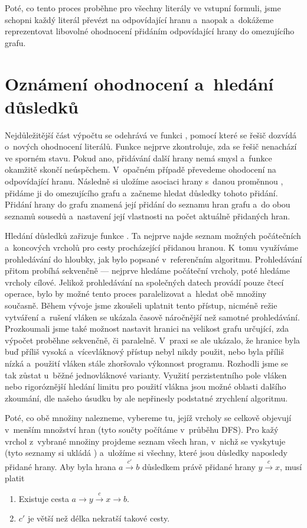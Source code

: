 Poté, co tento proces proběhne pro všechny literály ve vstupní formuli, jsme schopni každý literál převézt na odpovídající hranu a~naopak a~dokážeme reprezentovat libovolné ohodnocení přidáním odpovídající hrany do omezujícího grafu.

\section{Oznámení ohodnocení a~hledání důsledků}\label{dusl}

Nejdůležitější část výpočtu se odehrává ve funkci , pomocí které se řešič dozvídá o~nových ohodnocení literálů. Funkce nejprve zkontroluje, zda se řešič nenachází ve sporném stavu. Pokud ano, přidávání další hrany nemá smysl a~funkce okamžitě skončí neúspěchem. V~opačném případě převedeme ohodocení na odpovídající hranu. Následně si uložíme asociaci hrany s~danou proměnnou , přidáme ji do omezujícího grafu a~začneme hledat důsledky tohoto přidání. Přidání hrany do grafu znamená její přidání do seznamu hran grafu a~do obou seznamů sousedů a~nastavení její vlastnosti  na počet aktuálně přidaných hran.

Hledání důsledků zařizuje funkce . Ta nejprve najde seznam možných počátečních a~koncových vrcholů pro cesty procházející přidanou hranou. K~tomu využíváme prohledávání do hloubky, jak bylo popsané v~referenčním algoritmu. Prohledávání přitom probíhá sekvenčně --- nejprve hledáme počáteční vrcholy, poté hledáme vrcholy cílové. Jelikož prohledávání na společných datech provádí pouze čtecí operace, bylo by možné tento proces paralelizovat a~hledat obě množiny současně. Během vývoje jsme zkoušeli uplatnit tento přístup, nicméně režie vytváření a~rušení vláken  se ukázala časově náročnější než samotné prohledávání. Prozkoumali jsme také možnost nastavit hranici na velikost grafu určující, zda výpočet proběhne sekvenčně, či paralelně. V~praxi se ale ukázalo, že hranice byla buď příliš vysoká a~vícevláknový přístup nebyl nikdy použit, nebo byla příliš nízká a~použití vláken stále zhoršovalo výkonnost programu. Rozhodli jsme se tak zůstat u~běžné jednovláknové varianty. Využití perzistentního pole vláken nebo rigoróznější hledání limitu pro použití vlákna jsou možné oblasti dalšího zkoumání, dle našeho úsudku by ale nepřinesly podstatné zrychlení algoritmu.

Poté, co obě množiny nalezneme, vybereme tu, jejíž vrcholy se celkově objevují v~menším množství hran (tyto součty počítáme v~průběhu DFS). Pro kažý vrchol z~vybrané množiny projdeme seznam všech hran, v~nichž se vyskytuje (tyto seznamy si ukládá ) a~uložíme si všechny, které jsou důsledky naposledy přidané hrany. Aby byla hrana $a \xrightarrow{c'} b$ důsledkem právě přidané hrany $y \xrightarrow{c} x$, musí platit 
\begin{enumerate}
	\item Existuje cesta $a \rightarrow y \xrightarrow{c} x \rightarrow b$.
	\item $c'$ je větší než délka nekratší takové cesty.
\end{enumerate}

